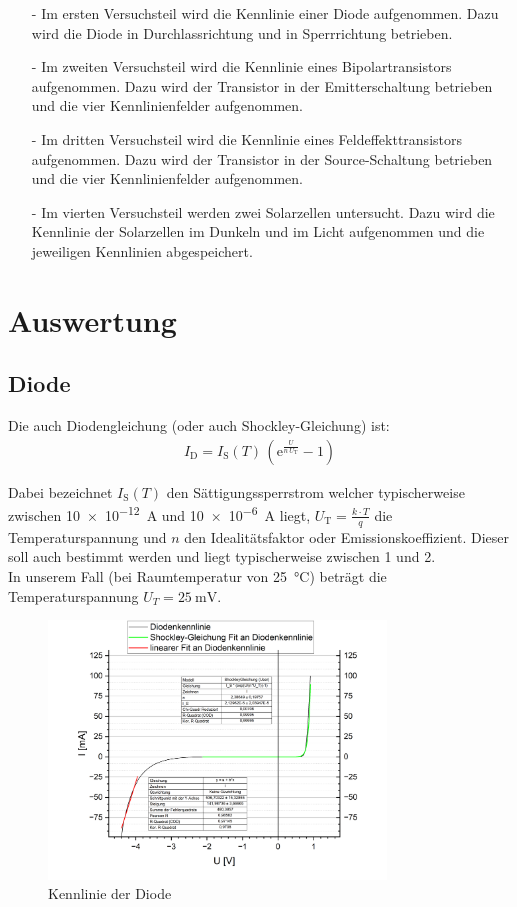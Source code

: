 \documentclass[12pt,a4paper,ngerman]{report}
\begin{document}
	\begin{itemize}
	\item[-] Im ersten Versuchsteil wird die Kennlinie einer Diode aufgenommen. Dazu wird die Diode in Durchlassrichtung und in Sperrrichtung betrieben.
	\item[-] Im zweiten Versuchsteil wird die Kennlinie eines Bipolartransistors aufgenommen. Dazu wird der Transistor in der Emitterschaltung betrieben und die vier Kennlinienfelder aufgenommen.
	\item[-] Im dritten Versuchsteil wird die Kennlinie eines Feldeffekttransistors aufgenommen. Dazu wird der Transistor in der Source-Schaltung betrieben und die vier Kennlinienfelder aufgenommen.
	\item[-] Im vierten Versuchsteil werden zwei Solarzellen untersucht. Dazu wird die Kennlinie der Solarzellen im Dunkeln und im Licht aufgenommen und die jeweiligen Kennlinien abgespeichert.
	\end{itemize}

\chapter{Auswertung}
	\section{Diode}
		Die auch Diodengleichung (oder auch Shockley-Gleichung) ist: 
		\begin{eqnarray}
		\label{eq:shockley}
		I_\text{D} = I_\text{S}(T) \, \left(\mathrm e^\frac{U}{n\,U_\text{T}} - 1 \right)
		\end{eqnarray}
		
		Dabei bezeichnet $I_\text{S}(T)$ den Sättigungssperrstrom welcher typischerweise zwischen \qty{10e-12}{\ampere} und \qty{10e-6}{\ampere} liegt, $ U_\text{T}= \frac{k \cdot T} q$ die Tem\-pe\-ra\-tur\-span\-nung und $n$ den Idealitätsfaktor oder Emissionskoeffizient. Dieser soll auch bestimmt werden und liegt typischerweise zwischen 1 und 2.\\ 
		In unserem Fall (bei Raumtemperatur von \qty{25}{\celsius}) beträgt die Temperaturspannung  $U_T = \qty{25}{\milli\volt}$.
		
		\begin{figure}
			\centering
			\includegraphics[width=0.8\textwidth]{Origin/Graph1.png}
			\caption{Kennlinie der Diode}
			\label{fig:Diodenkennlinie}
		\end{figure}
\end{document}
